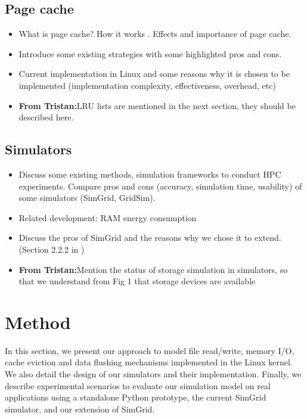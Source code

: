 \documentclass[conference]{IEEEtran}
\newcommand{\tristan}[1]{\color{orange}\textbf{From Tristan:}#1\color{black}}
\begin{document}
		\subsection{Page cache}
			\begin{itemize}
				\item What is page cache? How it works \cite{linuxdev3rd2010}. Effects and importance of page cache.
				\item Introduce some existing strategies with some highlighted pros and cons.
				\item Current implementation in Linux and some reasons why it is chosen to be implemented (implementation complexity, effectiveness, overhead, etc) \cite{linuxdev3rd2010}
				\item \tristan{LRU lists are mentioned in the next section, they should be described here.}
			\end{itemize}									

		\subsection{Simulators}
			\begin{itemize}
				\item Discuss some existing methods, simulation frameworks to conduct HPC experiments. Compare pros and cons (accuracy, simulation time, usability) of some simulators (SimGrid, GridSim).
				\item Related development: RAM energy consumption \cite{gill2019} \cite{ouarnoughi2017} 
				\item Discuss the pros of SimGrid and the reasons why we chose it to extend. (Section 2.2.2 in \cite{casanova2014})
				\item \tristan{Mention the status of storage simulation in simulators, so that we understand from Fig 1 that storage devices are available}
			\end{itemize}
			
	\section{Method}
		In this section, we present our approach to model file read/write,
		memory I/O, cache eviction and data flushing mechanisms implemented in
		the Linux kernel. We also detail the design of our simulators and their
		implementation. Finally, we describe experimental scenarios to evaluate
		our simulation model on real applications using a standalone Python
		prototype, the current SimGrid simulator, and our extension of SimGrid.
\end{document}
